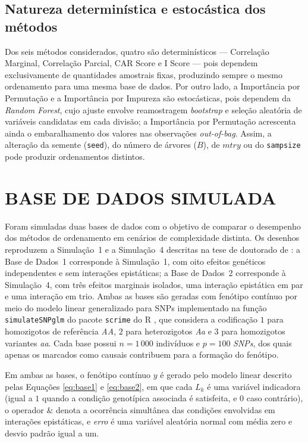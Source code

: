 \documentclass[12pt,fleqn]{article}
\newcommand{\citeonline}[1]{\citet{#1}}
\begin{document}
\subsection{Natureza determinística e estocástica dos métodos}

Dos seis métodos considerados, quatro são determinísticos --- Correlação Marginal, Correlação Parcial, CAR Score e I Score --- pois dependem exclusivamente de quantidades amostrais fixas, produzindo sempre o mesmo ordenamento para uma mesma base de dados. Por outro lado, a Importância por Permutação e a Importância por Impureza são estocásticas, pois dependem da \textit{Random Forest}, cujo ajuste envolve reamostragem \textit{bootstrap} e seleção aleatória de variáveis candidatas em cada divisão; a Importância por Permutação acrescenta ainda o embaralhamento dos valores nas observações \textit{out-of-bag}. Assim, a alteração da semente (\texttt{seed}), do número de árvores ($B$), de $mtry$ ou do \texttt{sampsize} pode produzir ordenamentos distintos.

\section{BASE DE DADOS SIMULADA}

Foram simuladas duas bases de dados com o objetivo de comparar o desempenho dos métodos de ordenamento em cenários de complexidade distinta. Os desenhos reproduzem a Simulação~1 e a Simulação~4 descritas na tese de doutorado de \citeonline{Oliveira2015}: a Base de Dados~1 corresponde à Simulação~1, com oito efeitos genéticos independentes e sem interações epistáticas; a Base de Dados~2 corresponde à Simulação~4, com três efeitos marginais isolados, uma interação epistática em par e uma interação em trio. Ambas as bases são geradas com fenótipo contínuo por meio do modelo linear generalizado para SNPs implementado na função \texttt{simulateSNPglm} do pacote \texttt{scrime} do R \citep{Schwender2013}, que considera a codificação $1$ para homozigotos de referência \textit{AA}, $2$ para heterozigotos \textit{Aa} e $3$ para homozigotos variantes \textit{aa}. Cada base possui $n = 1\,000$ indivíduos e $p = 100$ \emph{SNPs}, dos quais apenas os marcados como causais contribuem para a formação do fenótipo.

Em ambas as bases, o fenótipo contínuo $y$ é gerado pelo modelo linear descrito pelas Equações \ref{eq:base1} e \ref{eq:base2}, em que cada $L_k$ é uma variável indicadora (igual a $1$ quando a condição genotípica associada é satisfeita, e $0$ caso contrário), o operador $\mathbin{\&}$ denota a ocorrência simultânea das condições envolvidas em interações epistáticas, e \emph{erro} é uma variável aleatória normal com média zero e desvio padrão igual a um.
\end{document}
